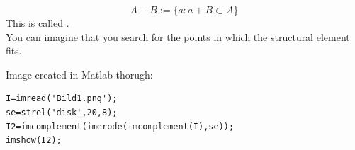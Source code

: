 \[A-B := \{a : a + B \subset A\}\]
This is called .\\
You can imagine that you search for the points in which the structural element fits.
\begin{center}
\end{center}

Image created in Matlab thorugh:
\begin{lstlisting}
I=imread('Bild1.png');
se=strel('disk',20,8);
I2=imcomplement(imerode(imcomplement(I),se));
imshow(I2);
\end{lstlisting}

